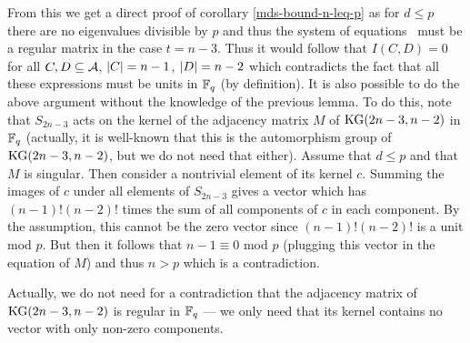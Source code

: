 From this we get a direct proof of corollary \autoref{mds-bound-n-leq-p} as for $d\leq p$ there are no eigenvalues divisible by $p$ and thus the system of equations~
must be a regular matrix in the case $t=n-3$. Thus it would follow that $I(C,D)=0$ for all $C,D\subseteq \mathcal{A}$, $\left|C\right|=n-1$, $\left|D\right|=n-2$ which contradicts the fact that all these expressions must be units in $\mathbb{F}_{q}$ (by definition).
It is also possible to do the above argument without the knowledge of the previous lemma. To do this, note that $S_{2n-3}$ acts on the kernel of the adjacency matrix $M$ of $\mathop\mathrm{KG}(2n-3,n-2)$ in $\mathbb{F}_{q}$ (actually, it is well-known that this is the automorphism group of $\mathop\mathrm{KG}(2n-3,n-2)$, but we do not need that either). Assume that $d\leq p$ and that $M$ is singular. Then consider a nontrivial element of its kernel $c$. Summing the images of $c$ under all elements of $S_{2n-3}$ gives a vector which has $(n-1)!(n-2)!$ times the sum of all components of $c$ in each component. By the assumption, this cannot be the zero vector since $(n-1)!(n-2)!$ is a unit mod $p$. But then it follows that $n-1\equiv 0$ mod $p$ (plugging this vector in the equation of $M$) and thus $n>p$ which is a contradiction.   

\begin{remark}
    Actually, we do not need for a contradiction that the adjacency matrix of $\mathop\mathrm{KG}(2n-3,n-2)$ is regular in $\mathbb{F}_{q}$ --- we only need that its kernel contains no vector with only non-zero components.
\end{remark}









